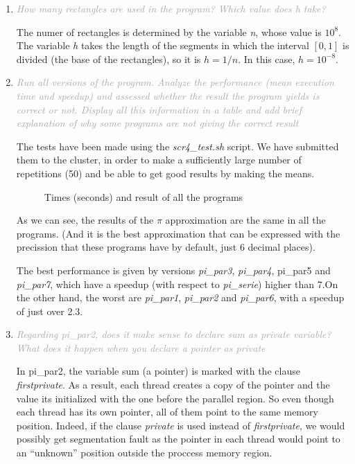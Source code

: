 \documentclass{article}
\newcommand{\greyItem}[1]{\item\emph{\textcolor{darkgray}{#1}}}
\begin{document}
\begin{enumerate}[label=4.\arabic*,leftmargin=*]

\greyItem{How many rectangles are used in the program? Which value does h take?}

The numer of rectangles is determined by the variable \emph{n}, whose value is ${10^8}$. The variable \emph{h} takes the length of the segments in which the interval $[0,1]$ is divided (the base of the rectangles), so it is $h=1/n$. In this case, $h=10^{-8}$.

\greyItem{ Run all versions of the program. Analyze the performance (mean execution time and speedup) and assessed whether the result the program yields is correct or not. Display all this information in a table and add brief explanation of why some programs are not giving the correct result}

The tests have been made using the \emph{scr4\_test.sh} script. We have submitted them to the cluster, in order to make a sufficiently large number of repetitions (50) and be able to get good results by making the means.

\begin{figure}[h]
    
    \centering
    \caption{Times (seconds) and result of all the programs}
\end{figure}

As we can see, the results of the $\pi$ approximation are the same in all the programs. (And it is the best approximation that can be expressed with the precission that these programs have by default, just 6 decimal places).

The best performance is given by versions \emph{pi\_par3}, \emph{pi\_par4}, {pi\_par5}  and \emph{pi\_par7}, which have a speedup (with respect to \emph{pi\_serie}) higher than 7.On the other hand, the worst are \emph{pi\_par1}, \emph{pi\_par2} and \emph{pi\_par6}, with a speedup of just over 2.3.

\greyItem{Regarding pi\_par2, does it make sense to declare sum as private variable? What does it happen when you declare a pointer as private}

In pi\_par2, the variable sum (a pointer) is marked with the clause \emph{firstprivate}. As a result, each thread creates a copy of the pointer and the value its initialized with the one before the parallel region. So even though each thread has its own pointer, all of them point to the same memory position. Indeed, if the clause \emph{private} is used instead of \emph{firstprivate}, we would possibly get segmentation fault as the pointer in each thread would point to an ``unknown'' position outside the proccess memory region.


\end{enumerate}
\end{document}
